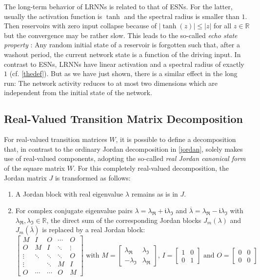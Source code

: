 \documentclass[twoside,11pt]{article}
\theoremstyle{definition}
\begin{document}
The long-term behavior of LRNNs is related to that of ESNs. For the latter,
usually the activation function is $\tanh$ and the spectral radius is smaller
than $1$. Then reservoirs with zero input collapse because of $|\!\tanh(z)| \le
|z|$ for all $z \in \mathbb{R}$ but the convergence may be rather slow. This leads
to the so-called \emph{echo state property} \citep{MJ13}: Any random initial
state of a reservoir is forgotten such that, after a washout period, the current
network state is a function of the driving input. In contrast to ESNs, LRNNs
have linear activation and a spectral radius of exactly $1$ (cf. \cref{thedef}).
But as we have just shown, there is a similar effect in the long run: The
network activity reduces to at most two dimensions which are independent from
the initial state of the network.

\subsection{Real-Valued Transition Matrix Decomposition}\label{real}

For real-valued transition matrices $W$, it is possible to define a
decomposition that, in contrast to the ordinary Jordan decomposition in
\cref{jordan}, solely makes use of real-valued components, adopting the
so-called \emph{real Jordan canonical form} \cite[Sect.~3.4.1]{HJ13} of the
square matrix $W$.
For this completely real-valued decomposition, the Jordan matrix $J$ is
transformed as follows:
\begin{enumerate}
  \item A Jordan block with real eigenvalue $\lambda$ remains as is in $J$.
  \item For complex conjugate eigenvalue pairs $\lambda = \lambda_\Re +
	\mathfrak{i}\lambda_\Im$ and $\overline{\lambda} = \lambda_\Re - \mathfrak{i}\lambda_\Im$
	with $\lambda_\Re,\lambda_\Im \in \mathbb{R}$, the
	direct sum of the corresponding Jordan blocks $J_m(\lambda)$ and
	$J_m(\overline{\lambda})$ is replaced by a real Jordan block:
	\[
	  \left[ \begin{array}{*{5}{c}}
		M & I & O & \cdots & O\\
		O & M & I & \ddots & \vdots\\
		\vdots & \ddots & \ddots & \ddots & O\\
		\vdots & & \ddots & M & I\\
		O & \cdots & \cdots & O & M
	  \end{array} \right]
	  \text{~with~}
	  M = \left[ \begin{array}{cc}
		\lambda_\Re & \lambda_\Im\\
		-\lambda_\Im & \lambda_\Re
	  \end{array} \right]
	  \!\text{, }
	  I = \left[ \begin{array}{cc}
		1 & 0\\
		0 & 1
	  \end{array} \right]
	  \text{ and }
	  O = \left[ \begin{array}{cc}
		0 & 0\\
		0 & 0
	  \end{array} \right]
	\]
\end{enumerate}
\end{document}
